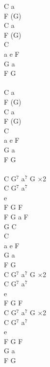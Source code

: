 \documentclass[a5paper, 10pt]{book}
\begin{document}
\begin{minipage}[t]{0.3\textwidth}
C a\\
F (G)\\
C a\\
F (G)\\
C\\
a e F\\
G a\\
F G\\
\\
C a\\
F (G)\\
C a\\
F (G)\\
C\\
a e F\\
G a\\
F G\\
\\
C G$^7$ a$^7$ G  \hspace*{5mm}$\times$2\\
C G$^7$ a$^7$\\
e\\
F G F\\
F G a F\\
G C\\

C\\
a e F\\
G a\\
F G\\

C G$^7$ a$^7$ G  \hspace*{5mm}$\times$2\\
C G$^7$ a$^7$\\
e\\
F G F\\

C G$^7$ a$^7$ G  \hspace*{5mm}$\times$2\\
C G$^7$ a$^7$\\
e\\
F G F\\
G a\\
F G\\

\end{minipage}

\newpage
\end{document}
